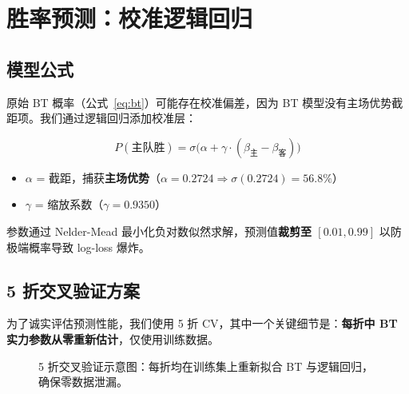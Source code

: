 \documentclass[11pt, a4paper]{article}
\begin{document}
\section{胜率预测：校准逻辑回归}
\label{sec:logistic}

\subsection{模型公式}

原始 BT 概率（公式~\ref{eq:bt}）可能存在校准偏差，因为 BT 模型没有主场优势截距项。我们通过逻辑回归添加校准层：

\begin{equation}
\boxed{P(\text{主队胜}) = \sigma\!\big(\alpha + \gamma \cdot (\beta_{\text{主}} - \beta_{\text{客}})\big)}
\label{eq:logistic}
\end{equation}

\begin{itemize}[nosep]
    \item $\alpha$ = 截距，捕获\textbf{主场优势}（$\alpha = 0.2724 \Rightarrow \sigma(0.2724) = 56.8\%$）
    \item $\gamma$ = 缩放系数（$\gamma = 0.9350$）
\end{itemize}

参数通过 Nelder-Mead 最小化负对数似然求解，预测值\textbf{裁剪至 $[0.01, 0.99]$} 以防极端概率导致 log-loss 爆炸。

\subsection{5 折交叉验证方案}

为了诚实评估预测性能，我们使用 5 折 CV，其中一个关键细节是：\textbf{每折中 BT 实力参数从零重新估计}，仅使用训练数据。

\begin{figure}[H]
\centering
{}
\caption{5 折交叉验证示意图：每折均在训练集上重新拟合 BT 与逻辑回归，确保零数据泄漏。}
\label{fig:cv}
\end{figure}
\end{document}
